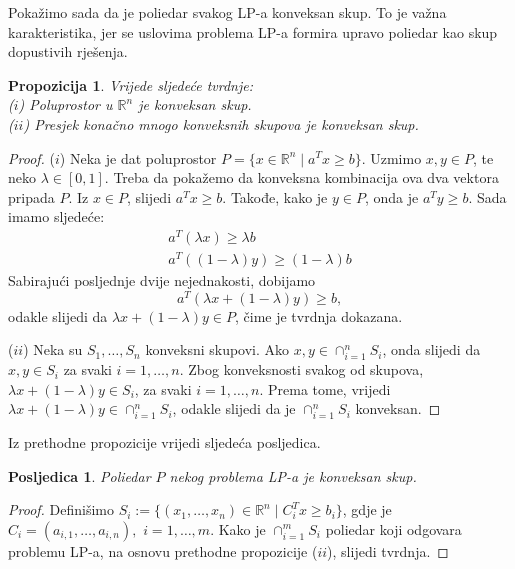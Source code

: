 \documentclass[b5paper, utf8, 11pt, colorlinks]{book}
\newtheorem{prop}{Propozicija}[chapter]
\newtheorem{poslje}{Posljedica}[chapter]
\theoremstyle{definition}
\begin{document}
 Pokažimo sada da je poliedar svakog LP-a konveksan skup. To je važna karakteristika, jer se uslovima problema LP-a formira upravo poliedar kao skup dopustivih rješenja.


 \begin{prop} Vrijede sljedeće tvrdnje: \\
  ($i$)  Poluprostor u $\mathbb{R}^n$ je konveksan skup.  \\
  ($ii$) Presjek konačno mnogo konveksnih skupova je konveksan skup. 
\end{prop}

 \begin{proof}
  ($i$) Neka je dat poluprostor $P = \{ x \in \mathbb{R}^n \mid a^T x \geq b \}$. Uzmimo $x, y \in P$, te neko $\lambda \in [0, 1]$. Treba da pokažemo da konveksna kombinacija ova dva vektora   pripada $P$. Iz $x \in P$, slijedi  $a^T x \geq b$. Takođe, kako je $y \in P$, onda  je  $a^T y \geq b$. 
  Sada  imamo sljedeće:
   \begin{align}
      a^T (\lambda x) \geq \lambda b \\
      a^T ((1-\lambda) y) \geq (1-\lambda) b 
   \end{align}
  Sabirajući posljednje dvije nejednakosti, dobijamo 
  \begin{equation}
      a^T( \lambda x + (1 - \lambda) y ) \geq b,
  \end{equation}
  odakle slijedi da $\lambda x + (1-\lambda) y \in P$, čime je tvrdnja dokazana.
  
  ($ii$) Neka su $S_1,\ldots, S_n$ konveksni skupovi. Ako $x,y \in \cap_{i=1}^n S_i$, onda slijedi da $x,y \in S_i$ za svaki $i=1,\ldots,n$. Zbog konveksnosti svakog od skupova,  
  $\lambda x + (1 - \lambda) y \in S_i$, za svaki $i=1,\ldots,n$. Prema tome, vrijedi $ \lambda x + (1-\lambda) y \in \cap_{i=1}^n S_i$, odakle slijedi da je $\cap_{i=1}^n S_i$ konveksan. 
\end{proof}

 Iz prethodne propozicije vrijedi sljedeća posljedica.

 \begin{poslje}
    Poliedar $P$ nekog problema LP-a je konveksan skup.	
 \end{poslje}
 
 \begin{proof}
   Definišimo $S_i:= \{(x_1,\ldots, x_n) \in \mathbb{R}^n \mid C_i^T x \geq b_i \}$, gdje je  $C_i = (a_{i,1}, \ldots, a_{i, n}),$  $ i=1,\ldots, m$. Kako je $\cap_{i=1}^m S_i$ poliedar koji odgovara problemu LP-a, na osnovu prethodne propozicije ($ii$), slijedi tvrdnja. 
 \end{proof}
\end{document}
